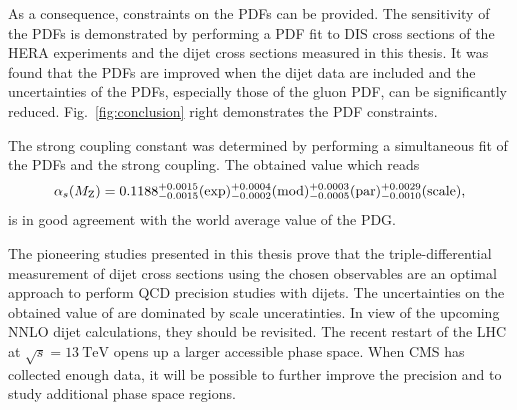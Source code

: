 As a consequence, constraints on the PDFs can be provided. The sensitivity of
the PDFs is demonstrated by performing a PDF fit to DIS cross sections of the
HERA experiments and the dijet cross sections measured in this thesis. It was
found that the PDFs are improved when the dijet data are included and the
uncertainties of the PDFs, especially those of the gluon PDF, can be
significantly reduced. Fig.~\ref{fig:conclusion} right demonstrates the PDF
constraints.

The strong coupling constant \asmz was determined by performing a simultaneous
fit of the PDFs and the strong coupling. The obtained value which reads
%
\begin{equation*}
  \alpha_{s}(M_\mathrm{Z}) = 0.1188_{-0.0015}^{+0.0015}(\mathrm{exp})_{-0.0002}^{+0.0004}(\mathrm{mod})_{-0.0005}^{+0.0003}(\mathrm{par})_{-0.0010}^{+0.0029}(\mathrm{scale}),
\end{equation*}
%
is in good agreement with the world average value of the PDG. 

The pioneering studies presented in this thesis prove that the triple-differential
measurement of dijet cross sections using the chosen observables are an optimal
approach to perform QCD precision studies with dijets. The uncertainties on the
obtained value of \asmz are dominated by scale unceratinties. In view of
the upcoming NNLO dijet calculations, they should be revisited. The recent
restart of the LHC at $\sqrt{s}=\SI{13}{\TeV}$ opens up a larger accessible
phase space. When CMS has collected enough data, it will be possible to further
improve the precision and to study additional phase space regions.

